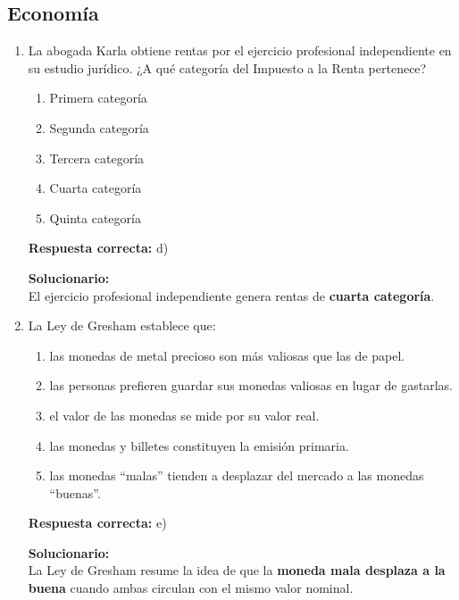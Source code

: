 \subsection*{Economía}

\begin{enumerate}

	
	\item La abogada Karla obtiene rentas por el ejercicio profesional independiente en su estudio jurídico. ¿A qué categoría del Impuesto a la Renta pertenece?
	\begin{enumerate}[label=\alph*)]
		\item Primera categoría
		\item Segunda categoría
		\item Tercera categoría
		\item Cuarta categoría
		\item Quinta categoría
	\end{enumerate}
	\textbf{Respuesta correcta:} d)
	
	\vspace{2mm}
	\textbf{Solucionario:}\\
	El ejercicio profesional independiente genera rentas de \textbf{cuarta categoría}.
	

	
	\vspace{6mm}
	
	\item La Ley de Gresham establece que:
	\begin{enumerate}[label=\alph*)]
		\item las monedas de metal precioso son más valiosas que las de papel.
		\item las personas prefieren guardar sus monedas valiosas en lugar de gastarlas.
		\item el valor de las monedas se mide por su valor real.
		\item las monedas y billetes constituyen la emisión primaria.
		\item las monedas ``malas'' tienden a desplazar del mercado a las monedas ``buenas''.
	\end{enumerate}
	\textbf{Respuesta correcta:} e)
	
	\vspace{2mm}
	\textbf{Solucionario:}\\
	La Ley de Gresham resume la idea de que la \textbf{moneda mala desplaza a la buena} cuando ambas circulan con el mismo valor nominal.
	


\end{enumerate}
